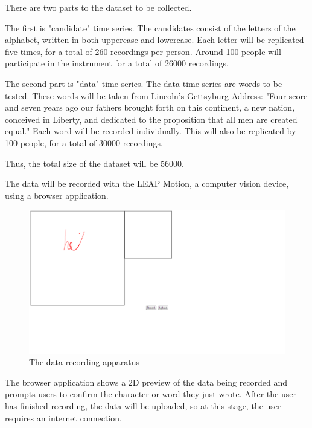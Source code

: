 There are two parts to the dataset to be collected.

The first is "candidate" time series. The candidates consist of the letters of the alphabet, written in both uppercase and lowercase. Each letter will be replicated five times, for a total of 260 recordings per person. Around 100 people will participate in the instrument for a total of 26000 recordings.

The second part is "data" time series. The data time series are words to be tested. These words will be taken from Lincoln's Gettsyburg Address: "Four score and seven years ago our fathers brought forth on this continent, a new nation, conceived in Liberty, and dedicated to the proposition that all men are created equal." Each word will be recorded individually. This will also be replicated by 100 people, for a total of 30000 recordings.

Thus, the total size of the dataset will be 56000.

The data will be recorded with the LEAP Motion, a computer vision device, using a browser application. \\
\begin{figure}
  \begin{center}
  \includegraphics[width=\columnwidth]{images/recording-1.PNG}
  \caption{The data recording apparatus}
  \label{fig:teaser}
  \end{center}  
\end{figure}
The browser application shows a 2D preview of the data being recorded and prompts users to confirm the character or word they just wrote.
After the user has finished recording, the data will be uploaded, so at this stage, the user requires an internet connection.
